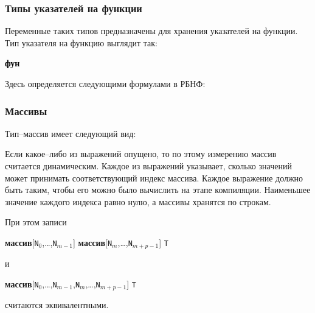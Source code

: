 \documentclass[10pt]{report}
\begin{document}
        \subsubsection{Типы указателей на функции}

Переменные таких типов предназначены для хранения указателей на функции. Тип указателя на функцию выглядит так:
\begin{center}
\noindent\textcolor{Green}{\textcolor{Black}{\textbf{фун}}  }
\end{center}

Здесь \textcolor{Green}{} определяется следующими формулами в РБНФ:

\textcolor{Green}{}

        \subsubsection{Массивы}
Тип--массив имеет следующий вид:
\begin{center}
\noindent\textcolor{Green}{}
\end{center}


Если какое--либо из выражений опущено, то по этому измерению массив считается динамическим. Каждое из выражений указывает, сколько значений может принимать соответствующий
индекс массива. Каждое выражение должно быть таким, чтобы его можно было вычислить на этапе компиляции. Наименьшее значение каждого индекса равно нулю, а массивы хранятся по
строкам.

При этом записи
\begin{center}
\textbf{массив}[\texttt{N}$_0$,\dots,\texttt{N}$_{m-1}$] \textbf{массив}[\texttt{N}$_{m}$,\dots,\texttt{N}$_{m+p-1}$] \texttt{T}
\end{center}
и
\begin{center}
\textbf{массив}[\texttt{N}$_0$,\dots,\texttt{N}$_{m-1}$,\texttt{N}$_{m}$,\dots,\texttt{N}$_{m+p-1}$] \texttt{T}
\end{center}
считаются эквивалентными.
\end{document}
